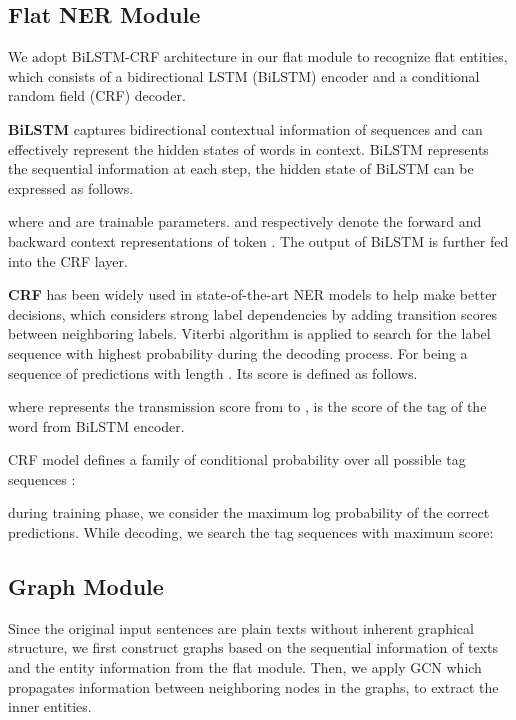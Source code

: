 \documentclass[11pt,a4paper]{article}
\begin{document}
\subsection{Flat NER Module}
We adopt BiLSTM-CRF architecture \cite{lample2016neural, ma2016end, yang2018ncrf,luo2019hierarchical} in our flat module to recognize flat entities, which consists of a bidirectional LSTM (BiLSTM) encoder and a conditional random field (CRF) decoder.

\textbf{BiLSTM} 
captures bidirectional contextual information of sequences and can effectively represent the hidden states of words in context.
 BiLSTM represents the sequential information at each step, the hidden state  of BiLSTM can be expressed as follows.

where  and  are trainable parameters.  and  respectively denote the forward and backward  context representations of token .
The output of BiLSTM  is further fed into the CRF layer.

\textbf{CRF}
 \cite{Lafferty:01} has been widely used in state-of-the-art NER models \cite{lample2016neural,ma2016end,yang2018ncrf} to help make better decisions,  which considers strong label dependencies by adding transition scores between neighboring labels.
Viterbi algorithm is applied to search for the label sequence with  highest probability during the decoding process.
For  being a sequence of predictions with length . Its score is defined as follows.

where  represents the transmission score  from   to ,
  is the score of the  tag of the  word from BiLSTM encoder.

CRF model defines a family of conditional probability  over all possible tag sequences :

during training phase, we consider the maximum log probability
of the correct predictions. 
While decoding, we search the tag sequences with maximum score:



\subsection{Graph Module}
Since the original input sentences are plain texts without inherent graphical structure, we first construct graphs based on the sequential information of texts and the entity information from the flat module.
Then, we apply GCN \cite{kipf2016semi, qian2018graphie} which propagates information between neighboring nodes in the graphs, to extract the inner entities.
\end{document}
